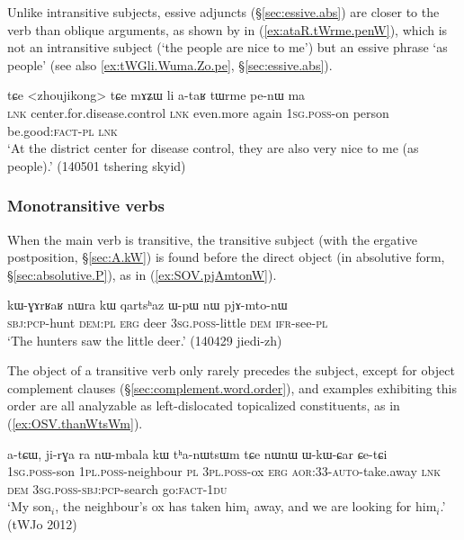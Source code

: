 Unlike intransitive subjects, essive adjuncts (§\ref{sec:essive.abs}) are closer to the verb than oblique arguments, as shown by  in (\ref{ex:ataR.tWrme.penW}), which is not an intransitive subject (`the people are nice to me') but an essive phrase `as people' (see also \ref{ex:tWGli.Wuma.Zo.pe}, §\ref{sec:essive.abs}).

\begin{exe}
\ex \label{ex:ataR.tWrme.penW}
\gll tɕe <zhoujikong> tɕe mɤʑɯ li a-taʁ tɯrme pe-nɯ ma \\
\textsc{lnk} center.for.disease.control \textsc{lnk} even.more again \textsc{1sg}.\textsc{poss}-on person be.good:\textsc{fact}-\textsc{pl} \textsc{lnk} \\
\glt `At the district center for disease control, they are also very nice to me (as people).' (140501 tshering skyid)
\end{exe}

 
\subsubsection{Monotransitive verbs} \label{sec:monotransitive.word.order}
When the main verb is transitive, the transitive subject (with the ergative postposition, §\ref{sec:A.kW}) is found before the direct object (in absolutive form, §\ref{sec:absolutive.P}), as in (\ref{ex:SOV.pjAmtonW}). 

\begin{exe}
\ex \label{ex:SOV.pjAmtonW}
\gll kɯ-ɣɤrʁaʁ nɯra kɯ qartsʰaz ɯ-pɯ nɯ pjɤ-mto-nɯ \\
\textsc{sbj}:\textsc{pcp}-hunt \textsc{dem}:\textsc{pl} \textsc{erg} deer \textsc{3sg}.\textsc{poss}-little \textsc{dem} \textsc{ifr}-see-\textsc{pl} \\
\glt `The hunters saw the little deer.' (140429 jiedi-zh)
\end{exe}

The object of a transitive verb only rarely precedes the subject, except for object complement clauses (§\ref{sec:complement.word.order}), and examples exhibiting this order are all analyzable as left-dislocated topicalized constituents, as in (\ref{ex:OSV.thanWtsWm}).

\begin{exe}
\ex \label{ex:OSV.thanWtsWm}
\gll a-tɕɯ, ji-rɣa ra nɯ-mbala kɯ tʰa-nɯtsɯm tɕe nɯnɯ ɯ-kɯ-ɕar ɕe-tɕi \\
\textsc{1sg}.\textsc{poss}-son \textsc{1pl}.\textsc{poss}-neighbour \textsc{pl} \textsc{3pl}.\textsc{poss}-ox \textsc{erg} \textsc{aor}:3\fl{}3-\textsc{auto}-take.away \textsc{lnk} \textsc{dem} \textsc{3sg}.\textsc{poss}-\textsc{sbj}:\textsc{pcp}-search go:\textsc{fact}-\textsc{1du} \\
\glt `My son$_i$, the neighbour's ox has taken him$_i$ away, and we are looking for him$_i$.' (tWJo 2012)
\end{exe}

